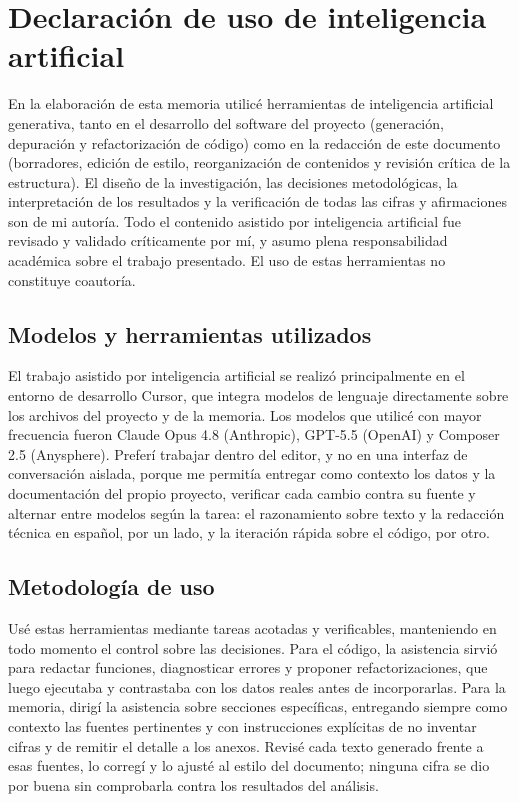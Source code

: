 \section{Declaración de uso de inteligencia artificial}
\label{sec:declaracion-ia}

En la elaboración de esta memoria utilicé herramientas de inteligencia artificial
generativa, tanto en el desarrollo del software del proyecto (generación,
depuración y refactorización de código) como en la redacción de este documento
(borradores, edición de estilo, reorganización de contenidos y revisión crítica
de la estructura). El diseño de la investigación, las decisiones metodológicas,
la interpretación de los resultados y la verificación de todas las cifras y
afirmaciones son de mi autoría. Todo el contenido asistido por inteligencia
artificial fue revisado y validado críticamente por mí, y asumo plena
responsabilidad académica sobre el trabajo presentado. El uso de estas
herramientas no constituye coautoría.

\subsection*{Modelos y herramientas utilizados}

El trabajo asistido por inteligencia artificial se realizó principalmente en el
entorno de desarrollo Cursor, que integra modelos de lenguaje directamente sobre
los archivos del proyecto y de la memoria. Los modelos que utilicé con mayor
frecuencia fueron Claude Opus 4.8 (Anthropic), GPT-5.5 (OpenAI) y Composer 2.5
(Anysphere). Preferí trabajar dentro del editor, y no en una interfaz de
conversación aislada, porque me permitía entregar como contexto los datos y la
documentación del propio proyecto, verificar cada cambio contra su fuente y
alternar entre modelos según la tarea: el razonamiento sobre texto y la redacción
técnica en español, por un lado, y la iteración rápida sobre el código, por otro.

\subsection*{Metodología de uso}

Usé estas herramientas mediante tareas acotadas y verificables, manteniendo en
todo momento el control sobre las decisiones. Para el código, la asistencia sirvió
para redactar funciones, diagnosticar errores y proponer refactorizaciones, que
luego ejecutaba y contrastaba con los datos reales antes de incorporarlas. Para
la memoria, dirigí la asistencia sobre secciones específicas, entregando siempre
como contexto las fuentes pertinentes y con instrucciones explícitas de no
inventar cifras y de remitir el detalle a los anexos. Revisé cada texto generado
frente a esas fuentes, lo corregí y lo ajusté al estilo del documento; ninguna
cifra se dio por buena sin comprobarla contra los resultados del análisis.

